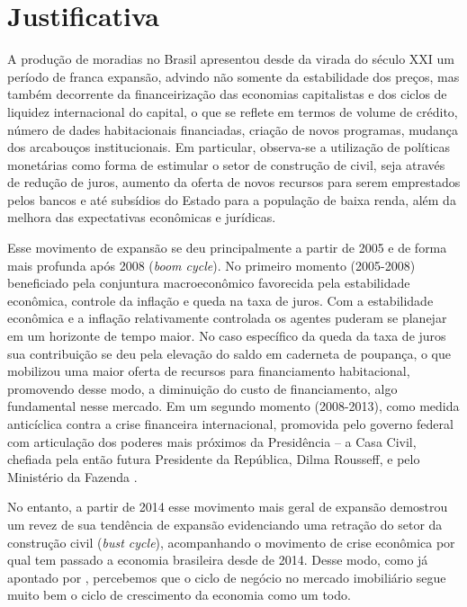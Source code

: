 \textual
{}
\setcounter{page}{2}

\section{Justificativa}

A produção de moradias no Brasil apresentou desde da virada do século XXI um período de franca expansão, advindo não somente da estabilidade dos preços, mas também decorrente da financeirização das economias capitalistas e dos ciclos de liquidez internacional do capital, o que se reflete em termos de volume de crédito, número de dades habitacionais financiadas, criação de novos programas, mudança dos arcabouços institucionais. Em particular, observa-se a utilização de políticas monetárias como forma de estimular o setor de construção de civil, seja através de redução de juros, aumento da oferta de novos recursos para serem emprestados pelos bancos e até subsídios do Estado para a população de baixa renda, além da melhora das expectativas econômicas e jurídicas.

Esse movimento de expansão se deu principalmente a partir de 2005 e de forma mais profunda após 2008 (\textit{boom cycle}). No primeiro momento (2005-2008) beneficiado pela conjuntura macroeconômico favorecida pela estabilidade econômica, controle da inflação e queda na taxa de juros. Com a estabilidade econômica e a inflação relativamente controlada os agentes puderam se planejar em um horizonte de tempo maior. No caso específico da queda da taxa de juros sua contribuição se deu pela elevação do saldo em caderneta de poupança, o que mobilizou uma maior oferta de recursos para financiamento habitacional, promovendo desse modo, a diminuição do custo de financiamento, algo fundamental nesse mercado. Em um segundo momento (2008-2013), como medida anticíclica contra a crise financeira internacional, promovida pelo governo federal com articulação dos poderes mais próximos da Presidência – a Casa Civil, chefiada pela então futura Presidente da República, Dilma Rousseff, e pelo Ministério da Fazenda \cite{CARDOSO2015}.

No entanto, a partir de 2014 esse movimento mais geral de expansão demostrou um revez de sua tendência de expansão evidenciando uma retração do setor da construção civil (\textit{bust cycle}), acompanhando o movimento de crise econômica por qual tem passado a economia brasileira desde de 2014. Desse modo, como já apontado por , percebemos que o ciclo de negócio no mercado imobiliário segue muito bem o ciclo de crescimento da economia como um todo.

